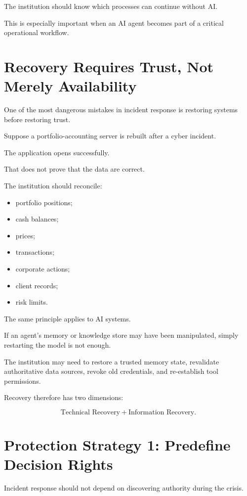 The institution should know which processes can continue without AI.

This is especially important when an AI agent becomes part of a critical operational workflow.

\section{Recovery Requires Trust, Not Merely Availability}

One of the most dangerous mistakes in incident response is restoring systems before restoring trust.

Suppose a portfolio-accounting server is rebuilt after a cyber incident.

The application opens successfully.

That does not prove that the data are correct.

The institution should reconcile:

\begin{itemize}
    \item portfolio positions;
    \item cash balances;
    \item prices;
    \item transactions;
    \item corporate actions;
    \item client records;
    \item risk limits.
\end{itemize}

The same principle applies to AI systems.

If an agent's memory or knowledge store may have been manipulated, simply restarting the model is not enough.

The institution may need to restore a trusted memory state, revalidate authoritative data sources, revoke old credentials, and re-establish tool permissions.

Recovery therefore has two dimensions:

\begin{equation}
\text{Technical Recovery}
+
\text{Information Recovery}.
\end{equation}

\section{Protection Strategy 1: Predefine Decision Rights}

Incident response should not depend on discovering authority during the crisis.

